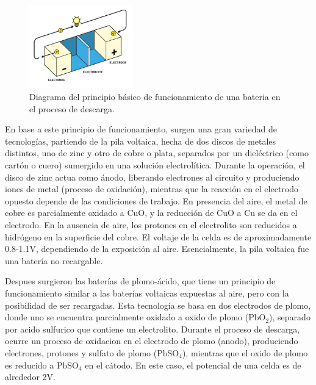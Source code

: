 \documentclass[10pt,a4paper]{article}
\begin{document}
    \begin{figure}[h!]
        \begin{center}
            \includegraphics[width=0.4\textwidth]{batt_func_ppr.png}
        \end{center}
        \caption{Diagrama del principio básico de funcionamiento de una bateria en el
        proceso de descarga.}
        \label{batt_wk_ppl}
    \end{figure}

    \noindent En base a este principio de funcionamiento, surgen una gran 
    variedad de tecnologías, partiendo de la pila voltaica, hecha de dos discos
    de metales distintos, uno de zinc y otro de cobre o plata, separados por un
    dieléctrico (como cartón o cuero) sumergido en una solución electrolítica.
    Durante la operación, el disco de zinc actua como ánodo, liberando
    electrones al circuito y produciendo iones de metal (proceso de oxidación),
    mientras que la reacción en el electrodo opuesto depende de las condiciones
    de trabajo. En presencia del aire, el metal de cobre es parcialmente
    oxidado a CuO, y la reducción de CuO a Cu se da en el electrodo. En la
    ausencia de aire, los protones en el electrolito son reducidos a hidrógeno
    en la superficie del cobre. El voltaje de la celda es de aproximadamente
    0.8-1.1V, dependiendo de la exposición al aire. Esencialmente, la pila
    voltaica fue una batería no recargable.
    
    \noindent Despues surgieron las baterías de plomo-ácido, que tiene un 
    principio de funcionamiento similar a las baterías voltaicas expuestas al 
    aire, pero con la posibilidad de ser recargadas. Esta tecnología se basa en 
    dos electrodos de plomo, donde uno se encuentra parcialmente oxidado a 
    oxido de plomo ($\mathrm{PbO_2}$), separado por acido sulfurico que contiene un 
    electrolito. Durante el proceso de descarga, ocurre un proceso de oxidacion 
    en el electrodo de plomo (anodo), produciendo electrones, protones y 
    sulfato de plomo ($\mathrm{PbSO_4}$), mientras que el oxido de plomo es 
    reducido a $\mathrm{PbSO_4}$ en el cátodo. En este caso, el potencial de 
    una celda es de alrededor 2V.
    
\end{document}

